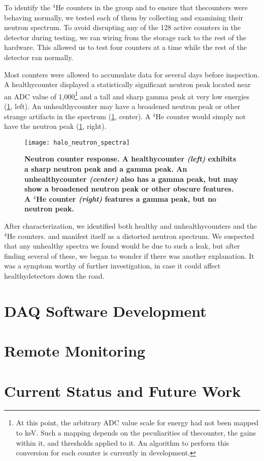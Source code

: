 		To identify the $^4$He counters in the group and to ensure that the{}\he counters were behaving normally, we tested each of them by collecting and examining their neutron spectrum. To avoid disrupting any of the 128 active counters in the detector during testing, we ran wiring from the storage rack to the rest of the hardware. This allowed us to test four counters at a time while the rest of the detector ran normally.

		Most counters were allowed to accumulate data for several days before inspection. A healthy{}\he counter displayed a statistically significant neutron peak located near an ADC value of 1,000\footnote{At this point, the arbitrary ADC value scale for energy had not been mapped to keV. Such a mapping depends on the peculiarities of the{}\he counter, the gains within it, and thresholds applied to it. An algorithm to perform this conversion for each counter is currently in development.} and a tall and sharp gamma peak at very low energies (\FIG \ref{fig:halo_neutron_spectra}, left). An unhealthy{}\he counter may have a broadened neutron peak or other strange artifacts in the spectrum (\FIG \ref{fig:halo_neutron_spectra}, center). A $^4$He counter would simply not have the neutron peak (\FIG \ref{fig:halo_neutron_spectra}, right).
		\begin{figure}[H]
			\texttt{[image: halo\_neutron\_spectra]}
			\caption[Neutron Counter Response]{\bf Neutron counter response. \rm A healthy{}\he counter \emph{(left)} exhibits a sharp neutron peak and a gamma peak. An unhealthy{}\he counter \emph{(center)} also has a gamma peak, but may show a broadened neutron peak or other obscure features. A $^4$He counter \emph{(right)} features a gamma peak, but no neutron peak.}
		\label{fig:halo_neutron_spectra}
		\end{figure}

		After characterization, we identified both healthy and unhealthy{}\he counters and the $^4$He counters.  and manifest itself as a distorted neutron spectrum. We suspected that any unhealthy spectra we found would be due to such a leak, but after finding several of these, we began to wonder if there was another explanation. It was a symptom worthy of further investigation, in case it could affect healthy{}\he detectors down the road.
	\section{DAQ Software Development}
		\filler
	\section{Remote Monitoring}
		\filler
	\section{Current Status and Future Work}
		\filler


